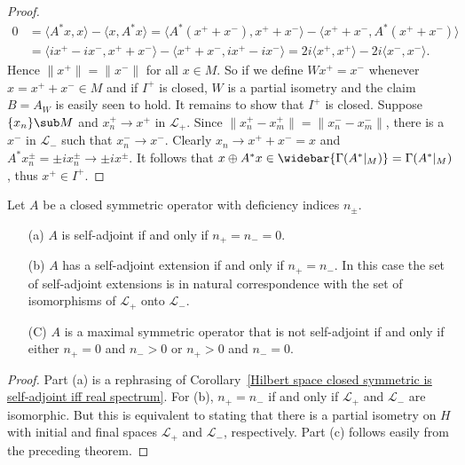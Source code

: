 \begin{proof}
\begin{align*}
0&=\langle A^*x,x\rangle-\langle x,A^*x\rangle=\langle A^*(x^++x^-),x^++x^-\rangle-\langle x^++x^-,A^*(x^++x^-)\rangle\\
&=\langle ix^+-ix^-,x^++x^-\rangle-\langle x^++x^-,ix^+-ix^-\rangle=2i\langle x^+,x^+\rangle-2i\langle x^-,x^-\rangle.
\end{align*}
Hence $\|x^+\|=\|x^-\|$ for all $x\in M$. So if we define $Wx^+=x^-$ whenever $x=x^++x^-\in M$ and if $I^+$ is closed, $W$ is a partial isometry and the claim $B=A_W$ is easily seen to hold. It remains to show that $I^+$ is closed. Suppose $\{x_n\}\sub M$ and $x_n^+\to x^+$ in $\mathscr{L}_+$. Since $\|x_n^+-x_m^+\|=\|x_n^--x_m^-\|$, there is a $x^-$ in $\mathscr{L}_-$ such that $x_n^-\to x^-$. Clearly $x_n\to x^++x^-=x$ and $A^*x_n^\pm=\pm ix_n^\pm\to\pm ix^\pm$. It follows that $x\oplus A^*x\in\widebar{\Gamma(A^*|_M)}=\Gamma(A^*|_M)$, thus $x^+\in I^+$.
\end{proof}
\begin{theorem}\label{Hilbert space self-adjoint extension char}
Let $A$ be a closed symmetric operator with deficiency indices $n_\pm$.
\begin{itemize}
\item[(a)] $A$ is self-adjoint if and only if $n_+=n_-=0$.
\item[(b)] $A$ has a self-adjoint extension if and only if $n_+=n_-$. In this case the set of self-adjoint extensions is in natural correspondence with the set of isomorphisms of $\mathscr{L}_+$ onto $\mathscr{L}_-$.
\item[(C)] $A$ is a maximal symmetric operator that is not self-adjoint if and only if either $n_+=0$ and $n_->0$ or $n_+>0$ and $n_-=0$.
\end{itemize}
\end{theorem}
\begin{proof}
Part (a) is a rephrasing of Corollary~\ref{Hilbert space closed symmetric is self-adjoint iff real spectrum}. For (b), $n_+=n_-$ if and only if $\mathscr{L}_+$ and $\mathscr{L}_-$ are isomorphic. But this is equivalent to stating that there is a partial isometry on $H$ with initial and final spaces $\mathscr{L}_+$ and $\mathscr{L}_-$, respectively. Part (c) follows easily from the preceding theorem.
\end{proof}
